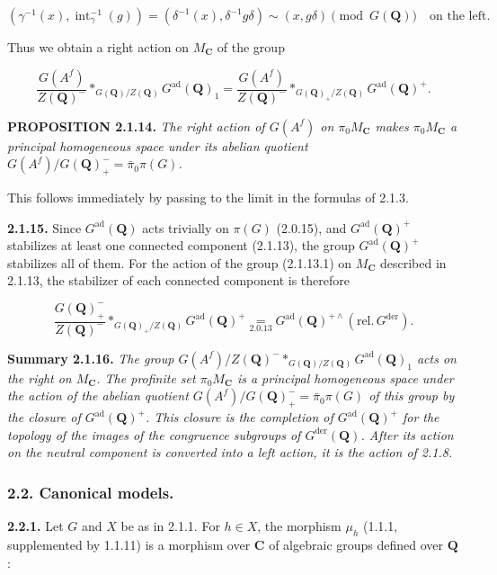 \documentclass[10pt,a4paper]{article}
\begin{document}
\[
(\gamma^{-1}(x),\operatorname{int}_{\gamma}^{-1}(g))
=(\delta^{-1}(x),\delta^{-1}g\delta)
\sim(x,g\delta)\pmod{G(\mathbf Q)}\quad\text{on the left}.
\]

Thus we obtain a right action on \(M_{\mathbf C}\) of the group

\[
\frac{G(A^f)}{Z(\mathbf Q)^{-}}*_{G(\mathbf Q)/Z(\mathbf Q)}G^{\mathrm{ad}}(\mathbf Q)_1
=\frac{G(A^f)}{Z(\mathbf Q)^{-}}*_{G(\mathbf Q)_+/Z(\mathbf Q)}G^{\mathrm{ad}}(\mathbf Q)^+.
\tag{2.1.13.1}
\]

\textbf{PROPOSITION 2.1.14.} \emph{The right action of \(G(A^f)\) on \(\pi_0M_{\mathbf C}\) makes \(\pi_0M_{\mathbf C}\) a principal homogeneous space under its abelian quotient \(G(A^f)/G(\mathbf Q)_+^{-}=\bar\pi_0\pi(G)\).}

This follows immediately by passing to the limit in the formulas of 2.1.3.

\textbf{2.1.15.} Since \(G^{\mathrm{ad}}(\mathbf Q)\) acts trivially on \(\pi(G)\) (2.0.15), and \(G^{\mathrm{ad}}(\mathbf Q)^+\) stabilizes at least one connected component (2.1.13), the group \(G^{\mathrm{ad}}(\mathbf Q)^+\) stabilizes all of them. For the action of the group (2.1.13.1) on \(M_{\mathbf C}\) described in 2.1.13, the stabilizer of each connected component is therefore

\[
\frac{G(\mathbf Q)_+^{-}}{Z(\mathbf Q)^{-}}*_{G(\mathbf Q)_+/Z(\mathbf Q)}G^{\mathrm{ad}}(\mathbf Q)^+
\underset{2.0.13}{=}G^{\mathrm{ad}}(\mathbf Q)^{+\wedge}(\mathrm{rel.}\,G^{\mathrm{der}}).
\tag{2.1.15.1}
\]

\textbf{Summary 2.1.16.} \emph{The group \(G(A^f)/Z(\mathbf Q)^{-}*_{G(\mathbf Q)/Z(\mathbf Q)}G^{\mathrm{ad}}(\mathbf Q)_1\) acts on the right on \(M_{\mathbf C}\). The profinite set \(\pi_0M_{\mathbf C}\) is a principal homogeneous space under the action of the abelian quotient \(G(A^f)/G(\mathbf Q)_+^{-}=\bar\pi_0\pi(G)\) of this group by the closure of \(G^{\mathrm{ad}}(\mathbf Q)^+\). This closure is the completion of \(G^{\mathrm{ad}}(\mathbf Q)^+\) for the topology of the images of the congruence subgroups of \(G^{\mathrm{der}}(\mathbf Q)\). After its action on the neutral component is converted into a left action, it is the action of 2.1.8.}

\subsubsection{2.2. Canonical models.}

\textbf{2.2.1.} Let \(G\) and \(X\) be as in 2.1.1. For \(h\in X\), the morphism \(\mu_h\) (1.1.1, supplemented by 1.1.11) is a morphism over \(\mathbf C\) of algebraic groups defined over \(\mathbf Q\):
\end{document}
